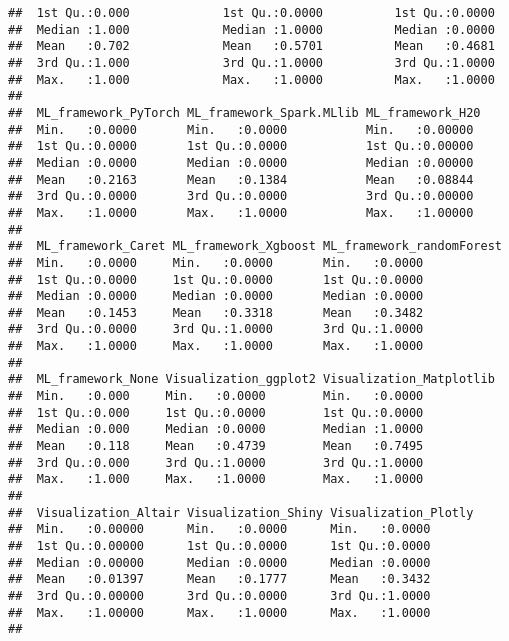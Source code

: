\documentclass[
]{article}
\begin{document}
\begin{verbatim}
##  1st Qu.:0.000             1st Qu.:0.0000          1st Qu.:0.0000    
##  Median :1.000             Median :1.0000          Median :0.0000    
##  Mean   :0.702             Mean   :0.5701          Mean   :0.4681    
##  3rd Qu.:1.000             3rd Qu.:1.0000          3rd Qu.:1.0000    
##  Max.   :1.000             Max.   :1.0000          Max.   :1.0000    
##                                                                      
##  ML_framework_PyTorch ML_framework_Spark.MLlib ML_framework_H20 
##  Min.   :0.0000       Min.   :0.0000           Min.   :0.00000  
##  1st Qu.:0.0000       1st Qu.:0.0000           1st Qu.:0.00000  
##  Median :0.0000       Median :0.0000           Median :0.00000  
##  Mean   :0.2163       Mean   :0.1384           Mean   :0.08844  
##  3rd Qu.:0.0000       3rd Qu.:0.0000           3rd Qu.:0.00000  
##  Max.   :1.0000       Max.   :1.0000           Max.   :1.00000  
##                                                                 
##  ML_framework_Caret ML_framework_Xgboost ML_framework_randomForest
##  Min.   :0.0000     Min.   :0.0000       Min.   :0.0000           
##  1st Qu.:0.0000     1st Qu.:0.0000       1st Qu.:0.0000           
##  Median :0.0000     Median :0.0000       Median :0.0000           
##  Mean   :0.1453     Mean   :0.3318       Mean   :0.3482           
##  3rd Qu.:0.0000     3rd Qu.:1.0000       3rd Qu.:1.0000           
##  Max.   :1.0000     Max.   :1.0000       Max.   :1.0000           
##                                                                   
##  ML_framework_None Visualization_ggplot2 Visualization_Matplotlib
##  Min.   :0.000     Min.   :0.0000        Min.   :0.0000          
##  1st Qu.:0.000     1st Qu.:0.0000        1st Qu.:0.0000          
##  Median :0.000     Median :0.0000        Median :1.0000          
##  Mean   :0.118     Mean   :0.4739        Mean   :0.7495          
##  3rd Qu.:0.000     3rd Qu.:1.0000        3rd Qu.:1.0000          
##  Max.   :1.000     Max.   :1.0000        Max.   :1.0000          
##                                                                  
##  Visualization_Altair Visualization_Shiny Visualization_Plotly
##  Min.   :0.00000      Min.   :0.0000      Min.   :0.0000      
##  1st Qu.:0.00000      1st Qu.:0.0000      1st Qu.:0.0000      
##  Median :0.00000      Median :0.0000      Median :0.0000      
##  Mean   :0.01397      Mean   :0.1777      Mean   :0.3432      
##  3rd Qu.:0.00000      3rd Qu.:0.0000      3rd Qu.:1.0000      
##  Max.   :1.00000      Max.   :1.0000      Max.   :1.0000      
##                                                               

\end{verbatim}
\end{document}
